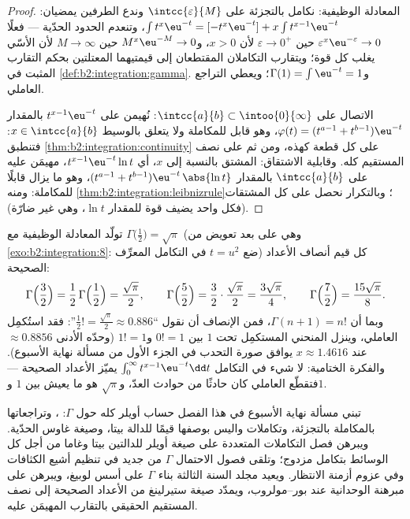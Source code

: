 \begin{proof}
المعادلة الوظيفية: نكامل بالتجزئة على $\intcc{\varepsilon}{M}$
وندع الطرفين يمضيان: $\int t^{x}\eu^{-t} = [-t^x\eu^{-t}] + x\int
t^{x-1}\eu^{-t}$، وتنعدم الحدود الحدّية --- فعلًا
$\varepsilon^x\eu^{-\varepsilon} \to 0$ حين $\varepsilon \to
0^+$ لأن $x > 0$، و$M^x\eu^{-M} \to 0$ حين $M \to \infty$
لأن الأسّي يغلب كل قوة؛ ويتقارب التكاملان المقتطعان
إلى قيمتيهما المعتلتين بحكم التقارب
المثبت في \cref{def:b2:integration:gamma}. و$\Gamma(1) = \int
\eu^{-t} = 1$؛ ويعطي التراجع العاملي.

الاتصال على $\intcc{a}{b} \subset \intoo{0}{\infty}$: نُهيمن على
$t^{x-1}\eu^{-t}$ بالمقدار $\varphi(t) = (t^{a-1} + t^{b-1})\eu^{-t}$،
وهو قابل للمكاملة ولا يتعلق بالوسيط $x \in \intcc{a}{b}$:
فتنطبق \cref{thm:b2:integration:continuity} على كل قطعة كهذه،
ومن ثم على نصف المستقيم كله. وقابلية الاشتقاق: المشتق بالنسبة إلى $x$،
أي $t^{x-1}\eu^{-t}\ln t$، مهيمَن عليه على $\intcc{a}{b}$ بالمقدار $(t^{a-1}
+ t^{b-1})\eu^{-t}\,\abs{\ln t}$، وهو ما يزال قابلًا للمكاملة:
ومنه \cref{thm:b2:integration:leibnizrule}؛ وبالتكرار نحصل على كل
المشتقات (فكل واحد يضيف قوة للمقدار $\ln t$، وهي غير ضارّة).
\end{proof}

\begin{example}\label{ex:b2:integration:halffactorial}
تولّد المعادلة الوظيفية مع $\Gamma\bigl(\frac12\bigr) =
\sqrt\pi$ (وهي على بعد تعويض من
\cref{exo:b2:integration:8}: ضع $t = u^2$ في التكامل
المعرِّف) كل قيم أنصاف الأعداد الصحيحة:
\[
\Gamma\Bigl(\frac32\Bigr) = \frac12\,\Gamma\Bigl(\frac12\Bigr)
= \frac{\sqrt\pi}{2},
\qquad
\Gamma\Bigl(\frac52\Bigr) = \frac32\cdot\frac{\sqrt\pi}{2}
= \frac{3\sqrt\pi}{4},
\qquad
\Gamma\Bigl(\frac72\Bigr) = \frac{15\sqrt\pi}{8} .
\]
وبما أن $\Gamma(n+1) = n!$، فمن الإنصاف أن نقول ``$\frac12! =
\frac{\sqrt\pi}{2} \approx 0.886$'': فقد استُكمِل
العاملي، وينزل المنحني المستكمِل تحت $1$
بين $0! = 1$ و$1! = 1$ (وحدّه الأدنى $\approx 0.8856$ عند
$x \approx 1.4616$ يوافق صورة التحدب في
الجزء الأول من مسألة نهاية الأسبوع). والفكرة الختامية: لا شيء في
التكامل $\int_0^\infty t^{x-1}\eu^{-t}\dd t$ يميّز
الأعداد الصحيحة --- فتقطّع العاملي كان حادثًا من حوادث
العدّ، و$\sqrt\pi$ هو ما يعيش بين $1$ و$1$.
\end{example}

\begin{remark}
تبني مسألة نهاية الأسبوع في هذا الفصل حساب أويلر
كله حول $\Gamma$: ، وتراجعاتها بالمكاملة بالتجزئة،
وتكاملات واليس بوصفها قيمًا للدالة بيتا، وصيغة غاوس
الحدّية. ويبرهن فصل التكاملات المتعددة على صيغة أويلر
للدالتين بيتا وغاما من أجل كل الوسائط بتكامل مزدوج؛ وتلقى
فصول الاحتمال $\Gamma$ من جديد في تنظيم
أشيع الكثافات وفي عزوم أزمنة الانتظار.
ويعيد مجلد السنة الثالثة بناء $\Gamma$ على أسس لوبيغ،
ويبرهن على مبرهنة الوحدانية عند بور--مولروب، ويمدّد
صيغة ستيرلينغ من الأعداد الصحيحة إلى نصف المستقيم الحقيقي
بالتقارب المهيمَن عليه.
\end{remark}

